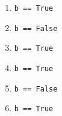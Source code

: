 \begin{multicols}{3}
    \begin{enumerate}
        \item \lstinline{b == True}
        \item \lstinline{b == False}
        \item \lstinline{b == True}
        \item \lstinline{b == True}
        \item \lstinline{b == False}
        \item \lstinline{b == True}
    \end{enumerate}
\end{multicols}
